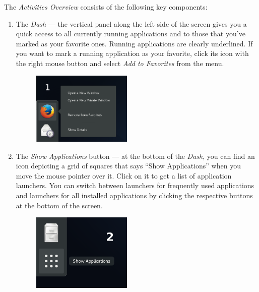 The \emph{Activities Overview} consists of the following key components:
\begin{enumerate}
\item The \emph{Dash} --- the vertical panel along the left side of the screen gives you a quick access to all currently running applications and to those that you've marked as your favorite ones. Running applications are clearly underlined. If you want to mark a running application as your favorite, click its icon with the right mouse button and select \emph{Add to Favorites} from the menu.

\begin{figure}[htbp]
\begin{center}
\includegraphics[width=0.45\textwidth]{img/dash-b}
 \label{fig:dash-b}
\end{center}
\end{figure}

\item The \emph{Show Applications} button --- at the bottom of the \emph{Dash}, you can find an icon depicting a grid of squares that says \enquote{Show Applications} when you move the mouse pointer over it. Click on it to get a list of application launchers. You can switch between launchers for frequently used applications and launchers for all installed applications by clicking the respective buttons at the bottom of the screen.

\begin{figure}[ht]
\begin{center}
\includegraphics[width=0.45\textwidth]{img/dash-a}
 \label{fig:dash-a}
\end{center}
\end{figure}


\end{enumerate}
